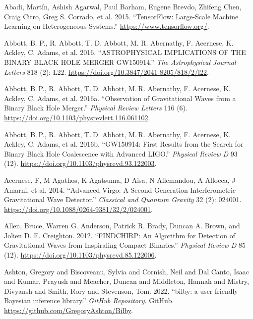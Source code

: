 \documentclass[10pt,a4paper,onecolumn]{article}
\newlength{\cslhangindent}
\newenvironment{CSLReferences}[3] %
 {%
  \setlength{\parindent}{0pt}
  \ifodd #1 \everypar{\setlength{\hangindent}{\cslhangindent}}\ignorespaces\fi
  \ifnum #2 > 0
  \setlength{\parskip}{#2\baselineskip}
  \fi
 }%
 {}
\begin{document}
\label{refs}
\begin{CSLReferences}{1}{0}
\bibitem[\citeproctext]{ref-tensorflow2015}
Abadi, Martín, Ashish Agarwal, Paul Barham, Eugene Brevdo, Zhifeng Chen,
Craig Citro, Greg S. Corrado, et al. 2015. {``{TensorFlow}: Large-Scale
Machine Learning on Heterogeneous Systems.''}
\url{https://www.tensorflow.org/}.

Abbott, B. P., R. Abbott, T. D. Abbott, M. R. Abernathy, F. Acernese, K.
Ackley, C. Adams, et al. 2016. {``ASTROPHYSICAL IMPLICATIONS OF THE
BINARY BLACK HOLE MERGER GW150914.''} \emph{The Astrophysical Journal
Letters} 818 (2): L22.
\url{https://doi.org/10.3847/2041-8205/818/2/l22}.

Abbott, B. P., R. Abbott, T. D. Abbott, M. R. Abernathy, F. Acernese, K.
Ackley, C. Adams, et al. 2016a. {``Observation of Gravitational Waves
from a Binary Black Hole Merger.''} \emph{Physical Review Letters} 116
(6). \url{https://doi.org/10.1103/physrevlett.116.061102}.

Abbott, B. P., R. Abbott, T. D. Abbott, M. R. Abernathy, F. Acernese, K.
Ackley, C. Adams, et al. 2016b. {``GW150914: First Results from the
Search for Binary Black Hole Coalescence with Advanced LIGO.''}
\emph{Physical Review D} 93 (12).
\url{https://doi.org/10.1103/physrevd.93.122003}.

Acernese, F, M Agathos, K Agatsuma, D Aisa, N Allemandou, A Allocca, J
Amarni, et al. 2014. {``Advanced Virgo: A Second-Generation
Interferometric Gravitational Wave Detector.''} \emph{Classical and
Quantum Gravity} 32 (2): 024001.
\url{https://doi.org/10.1088/0264-9381/32/2/024001}.

Allen, Bruce, Warren G. Anderson, Patrick R. Brady, Duncan A. Brown, and
Jolien D. E. Creighton. 2012. {``FINDCHIRP: An Algorithm for Detection
of Gravitational Waves from Inspiraling Compact Binaries.''}
\emph{Physical Review D} 85 (12).
\url{https://doi.org/10.1103/physrevd.85.122006}.

Ashton, Gregory and Biscoveanu, Sylvia and Cornish, Neil and Dal Canto,
Isaac and Kumar, Prayush and Meacher, Duncan and Middleton, Hannah and
Mistry, Divyansh and Smith, Rory and Stevenson, Tom. 2022. {``{bilby: a
user-friendly Bayesian inference library}.''} \emph{GitHub Repository}.
GitHub. \url{https://github.com/GregoryAshton/Bilby}.


\end{CSLReferences}
\end{document}
